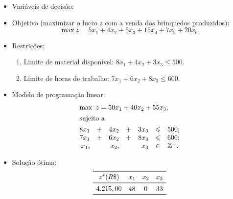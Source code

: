 \documentclass[12pt]{article}
\begin{document}
%
\begin{tcolorbox}[rounded corners, breakable,colback=yellow!5, colframe=red!40!black, title=\textbf{Modelo PL para o problema P-\myprob}]
 \begin{itemize}[topsep=0pt]
  \item Variáveis de decisão:
%
  \item Objetivo (maximizar o lucro $z$ com a venda dos brinquedos produzidos):
   $$\max z= 5x_1 + 4x_2 + 5x_3 + 15x_4 + 7x_5 + 20x_6.$$
%
  \item Restrições:
   \begin{enumerate}[topsep=0pt,itemsep=0pt]
    \item Limite de material disponível: $8x_1 + 4x_2 + 3x_3 \leqslant 500$.
    \item Limite de horas de trabalho: $7x_1 + 6x_2 + 8x_3 \leqslant 600$.
   \end{enumerate}
%
    \item Modelo de programação linear:
    \small{
     $$\begin{array}{rcrcrcl}
        \multicolumn{7}{l}{\max\ z= 50x_1 + 40x_2 + 55x_3,} \\[4pt]
        \multicolumn{7}{l}{\text{sujeito a}} \\[4pt]
          8x_1 & + & 4x_2 & + & 3x_3 & \leqslant & 500;\\
          7x_1 & + & 6x_2 & + & 8x_3 & \leqslant & 600;\\
          x_1, &   & x_2, &   & x_3 & \in       & \mathbb{Z}^+.
       \end{array}$$
    }
%
    \item Solução ótima:
     $$
      \begin{array}{cccc}
      \toprule
      z^* (R\$) & x_1 & x_2 & x_3\\
      \midrule
      4.215,00  &  48 &   0 &  33\\
      \bottomrule
      \end{array}
     $$
 \end{itemize}
\end{tcolorbox}
\end{document}
